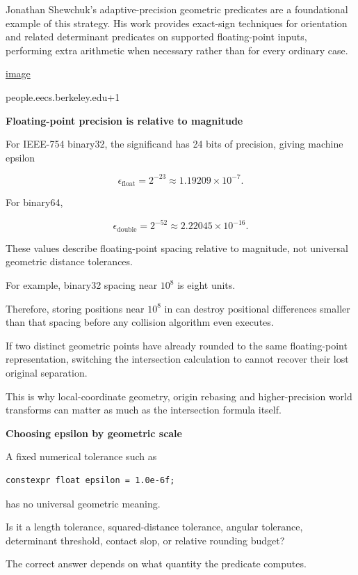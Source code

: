 Jonathan Shewchuk's adaptive-precision geometric predicates are a foundational example of this strategy. His work provides exact-sign techniques for orientation and related determinant predicates on supported floating-point inputs, performing extra arithmetic when necessary rather than for every ordinary case. 

\href{https://www.google.com/s2/favicons?domain=https://people.eecs.berkeley.edu&sz=32}{image}

people.eecs.berkeley.edu+1

\textbf{Floating-point precision is relative to magnitude}

For IEEE-754 binary32, the significand has 24 bits of precision, giving machine epsilon

\[
\epsilon_{\text{float}}=2^{-23}\approx1.19209\times10^{-7}.
\]

For binary64,

\[
\epsilon_{\text{double}}=2^{-52}\approx2.22045\times10^{-16}.
\]

These values describe floating-point spacing relative to magnitude, not universal geometric distance tolerances.

For example, binary32 spacing near \(10^8\) is eight units.

Therefore, storing positions near \(10^8\) in  can destroy positional differences smaller than that spacing before any collision algorithm even executes.

If two distinct geometric points have already rounded to the same floating-point representation, switching the intersection calculation to  cannot recover their lost original separation.

This is why local-coordinate geometry, origin rebasing and higher-precision world transforms can matter as much as the intersection formula itself.

\textbf{Choosing epsilon by geometric scale}

A fixed numerical tolerance such as

\begin{verbatim}
constexpr float epsilon = 1.0e-6f;
\end{verbatim}

has no universal geometric meaning.

Is it a length tolerance, squared-distance tolerance, angular tolerance, determinant threshold, contact slop, or relative rounding budget?

The correct answer depends on what quantity the predicate computes.

